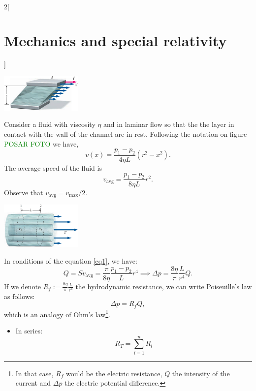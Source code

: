 \documentclass[class=article,10pt,crop=false]{standalone}
\begin{document}
\begin{multicols}{2}[\section{Mechanics and special relativity}]
\begin{concept}[Viscosity]
\end{concept}
\begin{minipage}{\linewidth}
    \centering
    \includegraphics[width=4cm]{Physics/1st/Mechanics_and_special_relativity/Images/vis.jpg}
\end{minipage}
\begin{concept}
Consider a fluid with viscosity $\eta$ and in laminar flow so that the the layer in contact with the wall of the channel are in rest. Following the notation on figure \textcolor{green}{POSAR FOTO} we have,
$$v(x)=\frac{p_1-p_2}{4\eta L}(r^2-x^2).$$ The average speed of the fluid is 
\begin{equation}
    v_\text{avg}=\frac{p_1-p_2}{8\eta L}r^2.
    \label{eq1}
\end{equation} Observe that $v_\text{avg}=v_\text{max}/2$.
\end{concept}
\begin{minipage}{\linewidth}
    \centering
    \includegraphics[width=4cm]{Physics/1st/Mechanics_and_special_relativity/Images/vis2.jpg}
\end{minipage}
\begin{concept}
In conditions of the equation \eqref{eq1}, we have: $$Q=Sv_\text{avg}=\frac{\pi}{8\eta }\frac{p_1-p_2}{L}r^4\implies\Delta p=\frac{8\eta}{\pi}\frac{L}{r^4}Q.$$ If we denote $\displaystyle R_f:=\frac{8\eta}{\pi}\frac{L}{r^4}$ the hydrodynamic resistance, we can write Poiseuille's law as follows: $$\Delta p=R_f Q,$$ which is an analogy of Ohm's law\footnote{In that case, $R_f$ would be the electric resistance, $Q$ the intensity of the current and $\Delta p$ the electric potential difference.}.
\end{concept}
\begin{concept}
\hfill\begin{itemize}
    \item In series: $$R_T=\sum_{i=1}^nR_i$$

\end{itemize}
\end{concept}
\end{multicols}
\end{document}
